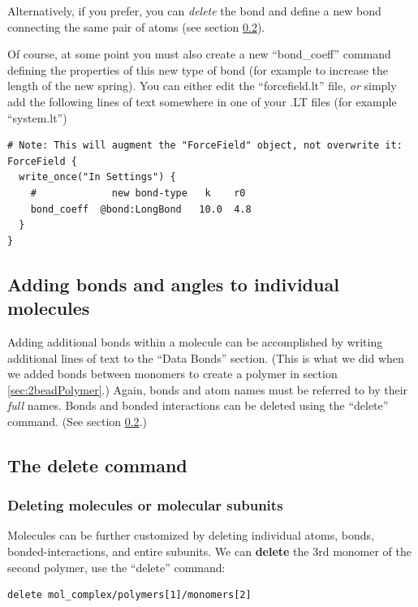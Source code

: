 \documentclass[11pt]{article}
\begin{document}
Alternatively, if you prefer, you can \textit{delete} the bond 
and define a new bond connecting the same pair of atoms
(see section \ref{sec:delete}).

Of course, at some point you must also create a new ``bond\_coeff''
command defining the properties of this new type of bond
(for example to increase the length of the new spring).
You can either edit the ``forcefield.lt'' file,
\textit{or} simply add the following lines
of text somewhere in one of your .LT files (for example ``system.lt'')
\begin{verbatim}
# Note: This will augment the "ForceField" object, not overwrite it:
ForceField { 
  write_once("In Settings") {
    #             new bond-type   k    r0
    bond_coeff  @bond:LongBond   10.0  4.8
  }
}
\end{verbatim}



\subsection{Adding bonds and angles to individual molecules}
\label{sec:adding_atoms_bonds}
Adding additional bonds within a molecule can be accomplished
by writing additional lines of text to the ``Data Bonds'' section.
(This is what we did when we added bonds between monomers to create a polymer
 in section \ref{sec:2beadPolymer}.)
Again, bonds and atom names must be referred to by their \textit{full} names.
Bonds and bonded interactions can be deleted using the ``delete'' command.
(See section \ref{sec:delete}.)


\subsection{The \textbf{delete} command}
\label{sec:delete}

\subsubsection{Deleting molecules or molecular subunits}
Molecules can be further customized by deleting 
individual atoms, bonds, bonded-interactions, and entire subunits.
We can \textbf{delete} the 3rd monomer of the second polymer, 
use the ``delete'' command:
\begin{verbatim}
delete mol_complex/polymers[1]/monomers[2]
\end{verbatim}
\end{document}
